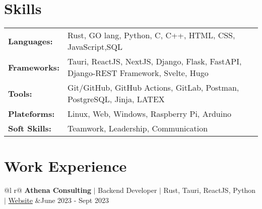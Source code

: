 \documentclass[legalpaper,11pt]{article}
\begin{document}
\section{Skills}
\begin{tabularx}{\linewidth}{@{}l X@{}}
\textbf{Languages:} &  \normalsize{Rust, GO lang, Python, C, C++, HTML, CSS, JavaScript,SQL}\\
\textbf{Frameworks:}  &  \normalsize{Tauri, ReactJS, NextJS, Django, Flask, FastAPI, Django-REST Framework, Svelte, Hugo}\\  
\textbf{Tools:} &  \normalsize{Git/GitHub, GitHub Actions, GitLab, Postman, PostgreSQL, Jinja, LATEX} \\
\textbf{Plateforms:} &  \normalsize{Linux, Web, Windows, Raspberry Pi, Arduino}\\
\textbf{Soft Skills:} &  \normalsize{Teamwork, Leadership, Communication}\\
\end{tabularx}

\section{Work Experience}

\begin{tabularx}{\linewidth}{ @{}l r@{} }
\textbf {Athena Consulting} $|$ Backend Developer $|$ Rust, Tauri, ReactJS, Python $|$ \href{https://www.athenaconsulting.io/}{Website} &\hfill June 2023 - Sept 2023 \\[3.75pt]
  \\
\end{tabularx}

\end{document}
